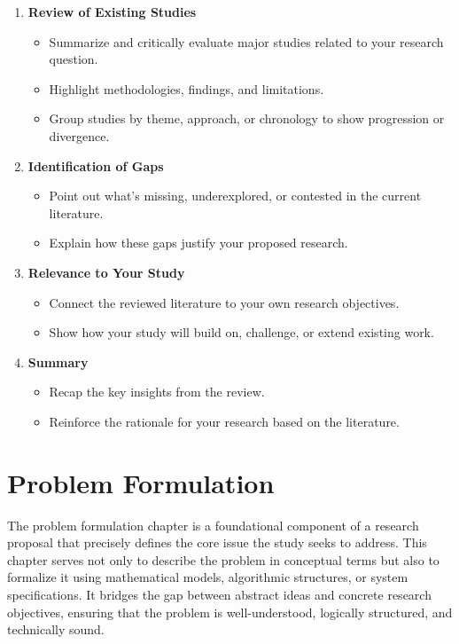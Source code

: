 \documentclass[PCOM,Proposal,Review]{mpThesis}
\newcommand{\Hd}[1]{{\color{SteelBlue}\bf#1}}
\begin{document}
\begin{MainMatter}
\begin{Remark}
\begin{enumerate}
\item \Hd{Review of Existing Studies}
  \begin{itemize}
  \item Summarize and critically evaluate major studies related to your research question.

  \item Highlight methodologies, findings, and limitations.

  \item Group studies by theme, approach, or chronology to show progression or divergence.
  \end{itemize}

\item \Hd{Identification of Gaps}
  \begin{itemize}
  \item Point out what’s missing, underexplored, or contested in the current literature.

  \item Explain how these gaps justify your proposed research.
  \end{itemize}

\item \Hd{Relevance to Your Study}
  \begin{itemize}
  \item Connect the reviewed literature to your own research objectives.

  \item Show how your study will build on, challenge, or extend existing work.
  \end{itemize}

\item \Hd{Summary}
  \begin{itemize}
  \item Recap the key insights from the review.

  \item Reinforce the rationale for your research based on the literature.
  \end{itemize}
\end{enumerate}
\end{Remark}

\chapter{Problem Formulation}
\label{ch:problem}
\minitoc

\begin{Remark}
The problem formulation chapter is a foundational component of a research proposal that precisely defines the core issue the study seeks to address.
This chapter serves not only to describe the problem in conceptual terms
but also to formalize it using mathematical models, algorithmic structures, or system specifications.
It bridges the gap between abstract ideas and concrete research objectives,
ensuring that the problem is well-understood, logically structured, and technically sound.


\end{Remark}
\end{MainMatter}
\end{document}
